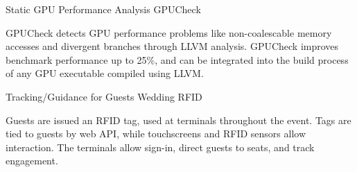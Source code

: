 \vspace{-2mm}
\begin{multicols}{2}
\begin{cventries}
    \cventry
        {Static GPU Performance Analysis} %
        {GPUCheck} %
        {} %
        {} %
        {
            \parbox[t]{8.5cm}{GPUCheck detects GPU performance problems like non-coalescable memory accesses and divergent branches through LLVM analysis.
            GPUCheck improves benchmark performance up to 25\%, and
            can be integrated into the build process of any GPU executable compiled using LLVM.
        }}
    \cventry
        {Tracking/Guidance for Guests} %
        {Wedding RFID} %
        {} %
        {} %
        {\parbox[t]{8.5cm}{
            Guests are issued an RFID tag, used at terminals throughout the event.
            Tags are tied to guests by web API, while touchscreens and RFID sensors allow interaction.
            The terminals allow sign-in, direct guests to seats, and track engagement.
        }}
\end{cventries}
\end{multicols}
